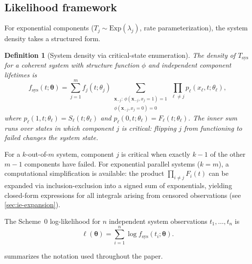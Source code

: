 \documentclass[12pt]{article}
\newtheorem{definition}{Definition}
\newcommand{\Tsys}{T_{\mathrm{sys}}}
\newcommand{\fsys}{f_{\mathrm{sys}}}
\newcommand{\btheta}{\boldsymbol{\theta}}
\newcommand{\bx}{\mathbf{x}}
\begin{document}
\subsection{Likelihood framework}\label{sec:likelihood}

For exponential components ($T_j \sim \text{Exp}(\lambda_j)$, rate
parameterization), the system density takes a structured form.

\begin{definition}[System density via critical-state enumeration]
\label{def:fsys}
The density of $\Tsys$ for a coherent system with structure function $\phi$
and independent component lifetimes is
\begin{equation}\label{eq:fsys}
  \fsys(t; \btheta) = \sum_{j=1}^{m} f_j(t; \theta_j)
    \!\!\sum_{\substack{\bx_{-j}:\, \phi(\bx_{-j}, x_j\!=\!1)=1 \\
    \phi(\bx_{-j}, x_j\!=\!0)=0}}
    \prod_{\ell \neq j} p_\ell(x_\ell, t; \theta_\ell),
\end{equation}
where $p_\ell(1, t; \theta_\ell) = S_\ell(t; \theta_\ell)$ and
$p_\ell(0, t; \theta_\ell) = F_\ell(t; \theta_\ell)$.  The inner sum runs
over states in which component $j$ is \emph{critical}: flipping $j$ from
functioning to failed changes the system state.
\end{definition}

For a $k$-out-of-$m$ system, component $j$ is critical when exactly $k - 1$
of the other $m - 1$ components have failed.  For exponential parallel
systems ($k = m$), a computational simplification is available: the product
$\prod_{i \neq j} F_i(t)$ can be expanded via inclusion-exclusion into a
signed sum of exponentials, yielding closed-form expressions for all
integrals arising from censored observations
(see \cref{sec:ie-expansion}).

The Scheme~0 log-likelihood for $n$ independent system observations
$t_1, \ldots, t_n$ is
\begin{equation}\label{eq:scheme0-ll}
  \ell(\btheta) = \sum_{i=1}^{n} \log \fsys(t_i; \btheta).
\end{equation}

 summarizes the notation used throughout the paper.
\end{document}

